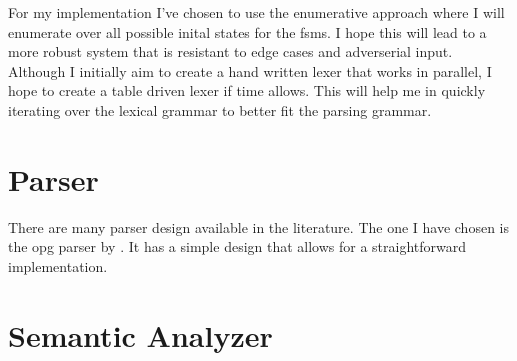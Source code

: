 For my implementation I've chosen to use the enumerative approach where I will
enumerate over all possible inital states for the \glspl{fsm}. I hope  this will
lead to a more robust system that is resistant to edge cases and adverserial
input. Although I initially aim to create a hand written lexer that works in
parallel, I hope to create a table driven lexer if time allows. This will help
me in quickly iterating over the lexical grammar to better fit the parsing
grammar.

\section{Parser} \label{parser}

There are many parser design available in the literature. The one I have chosen
is the \gls{opg} parser by \cite{barenghi_parallel_2015}. It has a simple design
that allows for a straightforward implementation. 

\section{Semantic Analyzer} \label{semantic_analyzer}
